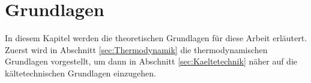 \chapter{Grundlagen}
\label{cha:Grundlagen}



In diesem Kapitel werden die  theoretischen Grundlagen für diese Arbeit erläutert. 
Zuerst wird in Abschnitt \ref{sec:Thermodynamik} die thermodynamischen Grundlagen vorgestellt, um dann in Abschnitt \ref{sec:Kaeltetechnik} näher auf die kältetechnischen Grundlagen einzugehen. 






